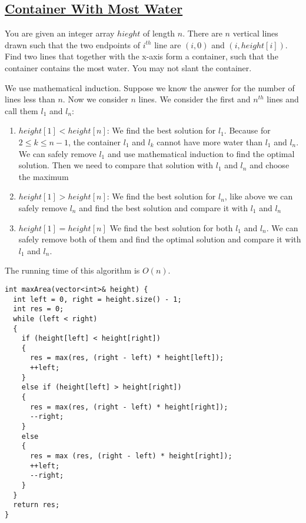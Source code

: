 \documentclass{book}
\begin{document}
	\subsection{\href{https://leetcode.com/problems/container-with-most-water/}{Container With Most Water}}
	You are given an integer array $hieght$ of length $n$. There are $n$ vertical lines drawn such that the two endpoints of $i^{th}$ line are $(i, 0)$ and $(i, height[i])$. Find two lines that together with the x-axis form a container, such that the container contains the most water. You may not slant the container.
	\par We use mathematical induction. Suppose we know the answer for the number of lines less than $n$. Now we consider $n$ lines. We consider the first and $n^{th}$ lines and call them $l_1$ and $l_n$:
	\begin{enumerate}
		\item $height[1] < height[n]$: We find the best solution for $l_1$. Because for $2 \le k \le n - 1$, the container $l_1$ and $l_k$ cannot have more water than $l_1$ and $l_n$. We can safely remove $l_1$ and use mathematical induction to find the optimal solution. Then we need to compare that solution with $l_1$ and $l_n$ and choose the maximum
		\item $height[1] > height[n]$: We find the best solution for $l_n$, like above we can safely remove $l_n$ and find the best solution and compare it with $l_1$ and $l_n$
		\item $height[1] = height[n]$ We find the best solution for both $l_1$ and $l_n$. We can safely remove both of them and find the optimal solution and compare it with $l_1$ and $l_n$.
	\end{enumerate}
	The running time of this algorithm is $O(n)$.
	\begin{lstlisting}
int maxArea(vector<int>& height) {
  int left = 0, right = height.size() - 1;
  int res = 0;
  while (left < right)
  {
    if (height[left] < height[right])
    {
      res = max(res, (right - left) * height[left]);
      ++left;
    }
    else if (height[left] > height[right])
    {
      res = max(res, (right - left) * height[right]);
      --right;
    }
    else
    {
      res = max (res, (right - left) * height[right]);
      ++left;
      --right;
    }
  }
  return res;
}
	\end{lstlisting}
\end{document}
